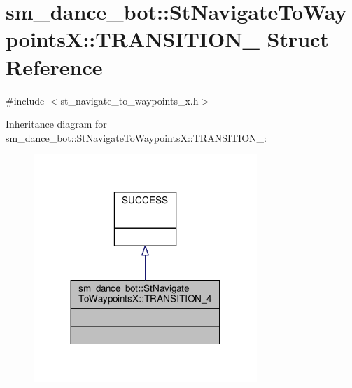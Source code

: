 \hypertarget{structsm__dance__bot_1_1StNavigateToWaypointsX_1_1TRANSITION__4}{}\section{sm\+\_\+dance\+\_\+bot\+:\+:St\+Navigate\+To\+WaypointsX\+:\+:T\+R\+A\+N\+S\+I\+T\+I\+O\+N\+\_ Struct Reference}
\label{structsm__dance__bot_1_1StNavigateToWaypointsX_1_1TRANSITION__4}


{\ttfamily \#include $<$st\+\_\+navigate\+\_\+to\+\_\+waypoints\+\_\+x.\+h$>$}



Inheritance diagram for sm\+\_\+dance\+\_\+bot\+:\+:St\+Navigate\+To\+WaypointsX\+:\+:T\+R\+A\+N\+S\+I\+T\+I\+O\+N\+\_\+:\nopagebreak
\begin{figure}[H]
\begin{center}
\leavevmode
\includegraphics[width=239pt]{structsm__dance__bot_1_1StNavigateToWaypointsX_1_1TRANSITION__4__inherit__graph}
\end{center}
\end{figure}


